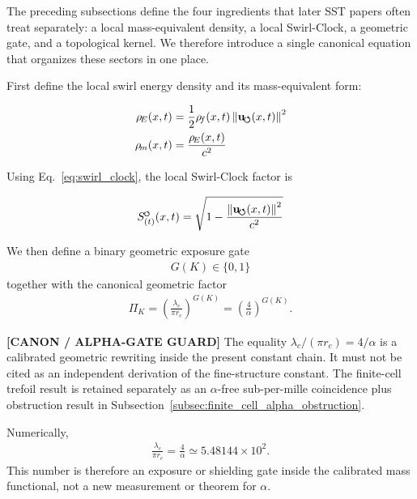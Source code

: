 \documentclass[11pt]{article}
\theoremstyle{definition}
\theoremstyle{plain}
\theoremstyle{remark}
\newcommand{\swirlarrow}{\mathchoice{\mkern-2mu\scriptstyle\boldsymbol{\circlearrowleft}}{\mkern-2mu\scriptstyle\boldsymbol{\circlearrowleft}}{\mkern-2mu\scriptscriptstyle\boldsymbol{\circlearrowleft}}{\mkern-2mu\scriptscriptstyle\boldsymbol{\circlearrowleft}}}
\newcommand{\rhoF}{{\rho_{\!f}}}
\newcommand{\rhoE}{\rho_{\!E}}
\newcommand{\rhoM}{\rho_{\!m}}
\newcommand{\SwirlClock}{{S_{(t)}^{\swirlarrow}}}
\newcommand{\rc}{{r_c}}
\newcommand{\uswirl}{\mathbf{u}_{\!\boldsymbol{\circlearrowleft}}}
\begin{document}
        The preceding subsections define the four ingredients that later SST papers often treat separately:
        a local mass-equivalent density, a local Swirl-Clock, a geometric gate, and a topological kernel.
        We therefore introduce a single canonical equation that organizes these sectors in one place.

        First define the local swirl energy density and its mass-equivalent form:

        \begin{align}
            \rhoE(x,t) &= \frac{1}{2}\rhoF(x,t)\,\norm{\uswirl(x,t)}^2 \\
            \rhoM(x,t) &= \frac{\rhoE(x,t)}{c^2}
        \end{align}

        Using Eq.~\ref{eq:swirl_clock}, the local Swirl-Clock factor is

        \begin{align}
            \SwirlClock(x,t) = \sqrt{1 - \frac{\norm{\uswirl(x,t)}^2}{c^2}}
        \end{align}

        We then define a binary geometric exposure gate
        \begin{align}
            G(K) \in \{0,1\}
        \end{align}
        together with the canonical geometric factor
        \begin{align}
            \Pi_K = \left( \frac{\lambda_c}{\pi \rc} \right)^{G(K)} = \left( \frac{4}{\alpha} \right)^{G(K)} .
        \end{align}

        \textbf{[CANON / ALPHA-GATE GUARD]} The equality \(\lambda_c/(\pi\rc)=4/\alpha\) is a calibrated geometric rewriting inside the present constant chain. It must not be cited as an independent derivation of the fine-structure constant. The finite-cell trefoil result is retained separately as an \(\alpha\)-free sub-per-mille coincidence plus obstruction result in Subsection~\ref{subsec:finite_cell_alpha_obstruction}.

        Numerically,
        \begin{align}
            \frac{\lambda_c}{\pi\rc}
            =
            \frac{4}{\alpha}
            \simeq 5.48144\times10^{2}.
            \label{eq:alpha_gate_numeric_guard}
        \end{align}
        This number is therefore an exposure or shielding gate inside the calibrated mass functional, not a new measurement or theorem for \(\alpha\).
\end{document}

